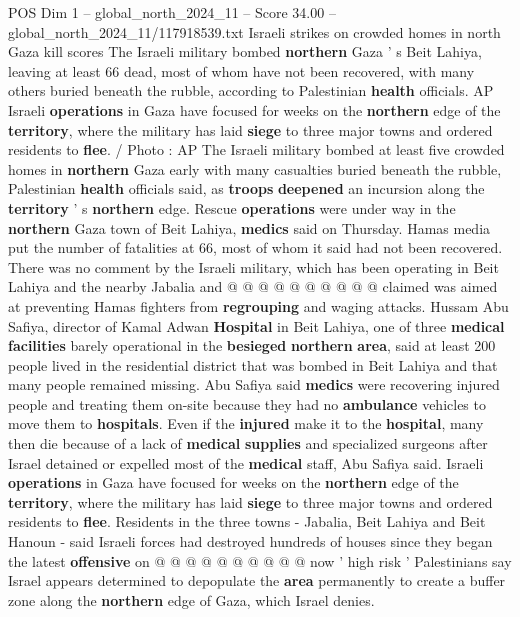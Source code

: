 \begin{textsample}{POS Dim 1 – global\_north\_2024\_11 – Score 34.00 – global\_north\_2024\_11/117918539.txt}  \label{ex:f1_pos_338}
Israeli strikes on crowded homes in north Gaza kill scores The Israeli military bombed \textbf{northern} Gaza ' s Beit Lahiya, leaving at least 66 dead, most of whom have not been recovered, with many others buried beneath the rubble, according to Palestinian \textbf{health} officials.
AP Israeli \textbf{operations} in Gaza have focused for weeks on the \textbf{northern} edge of the \textbf{territory}, where the military has laid \textbf{siege} to three major towns and ordered residents to \textbf{flee}. / Photo : AP The Israeli military bombed at least five crowded homes in \textbf{northern} Gaza early with many casualties buried beneath the rubble, Palestinian \textbf{health} officials said, as \textbf{troops} \textbf{deepened} an incursion along the \textbf{territory} ' s \textbf{northern} edge.
Rescue \textbf{operations} were under way in the \textbf{northern} Gaza town of Beit Lahiya, \textbf{medics} said on Thursday.
Hamas media put the number of fatalities at 66, most of whom it said had not been recovered.
There was no comment by the Israeli military, which has been operating in Beit Lahiya and the nearby Jabalia and @ @ @ @ @ @ @ @ @ @ claimed was aimed at preventing Hamas fighters from \textbf{regrouping} and waging attacks.
Hussam Abu Safiya, director of Kamal Adwan \textbf{Hospital} in Beit Lahiya, one of three \textbf{medical} \textbf{facilities} barely operational in the \textbf{besieged} \textbf{northern} \textbf{area}, said at least 200 people lived in the residential district that was bombed in Beit Lahiya and that many people remained missing.
Abu Safiya said \textbf{medics} were recovering injured people and treating them on-site because they had no \textbf{ambulance} vehicles to move them to \textbf{hospitals}.
Even if the \textbf{injured} make it to the \textbf{hospital}, many then die because of a lack of \textbf{medical} \textbf{supplies} and specialized surgeons after Israel detained or expelled most of the \textbf{medical} staff, Abu Safiya said.
Israeli \textbf{operations} in Gaza have focused for weeks on the \textbf{northern} edge of the \textbf{territory}, where the military has laid \textbf{siege} to three major towns and ordered residents to \textbf{flee}.
Residents in the three towns - Jabalia, Beit Lahiya and Beit Hanoun - said Israeli forces had destroyed hundreds of houses since they began the latest \textbf{offensive} on @ @ @ @ @ @ @ @ @ @ now ' high risk ' Palestinians say Israel appears determined to depopulate the \textbf{area} permanently to create a buffer zone along the \textbf{northern} edge of Gaza, which Israel denies.

\end{textsample}
